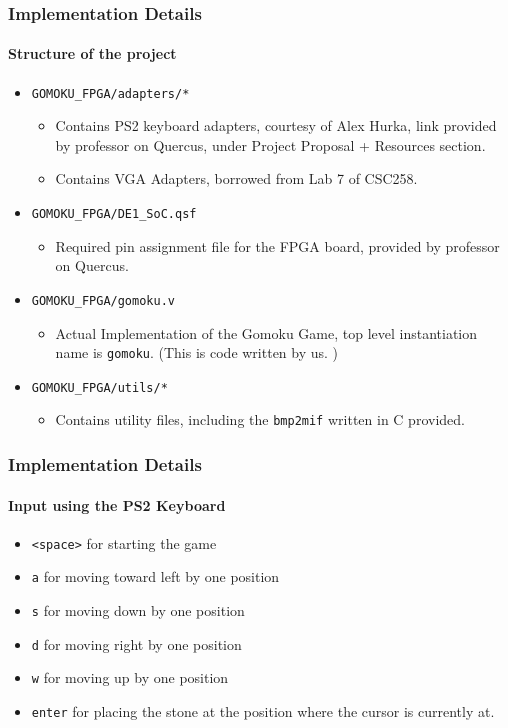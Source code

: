 \documentclass{beamer}
\begin{document}
\begin{frame}
    \frametitle{Implementation Details}
    \framesubtitle{Structure of the project}
    \begin{itemize}
        \item \texttt{GOMOKU\_FPGA/adapters/*}
        \begin{itemize}
            \item Contains PS2 keyboard adapters, courtesy of Alex Hurka, link provided by professor on Quercus, under Project Proposal + Resources section. 
            \item Contains VGA Adapters, borrowed from Lab 7 of CSC258.
        \end{itemize}
        \item \texttt{GOMOKU\_FPGA/DE1\_SoC.qsf}
        \begin{itemize}
            \item Required pin assignment file for the FPGA board, provided by professor on Quercus.
        \end{itemize}
        \item \texttt{GOMOKU\_FPGA/gomoku.v}
        \begin{itemize}
            \item Actual Implementation of the Gomoku Game, top level instantiation name is \texttt{gomoku}. (This is code written by us. )
        \end{itemize}
        \item \texttt{GOMOKU\_FPGA/utils/*}
        \begin{itemize}
            \item Contains utility files, including the \texttt{bmp2mif} written in C provided.  
        \end{itemize}
    \end{itemize}
\end{frame}

\begin{frame}
    \frametitle{Implementation Details}
    \framesubtitle{Input using the PS2 Keyboard}
    \begin{itemize}
        \item \texttt{<space>} for starting the game
        \item \texttt{a} for moving toward left by one position
        \item \texttt{s} for moving down by one position
        \item \texttt{d} for moving right by one position
        \item \texttt{w} for moving up by one position
        \item \texttt{enter} for placing the stone at the position where the cursor is currently at.
        
    \end{itemize}
\end{frame}
\end{document}
